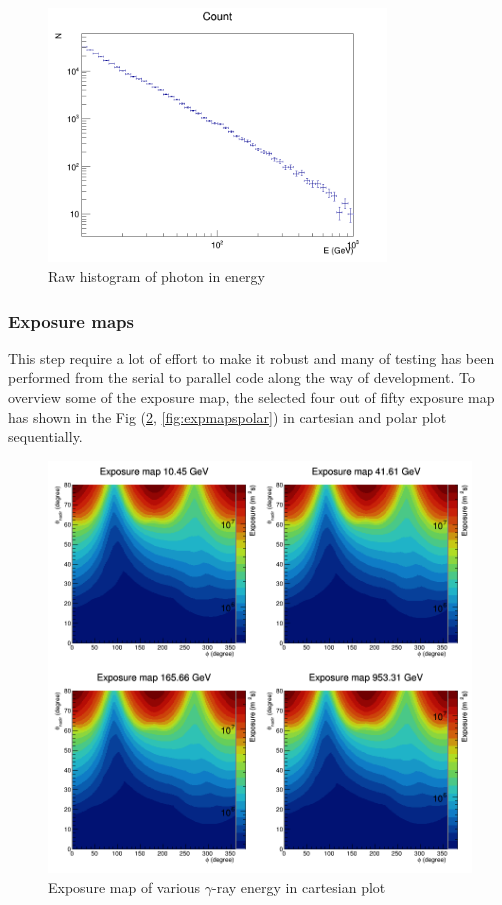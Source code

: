 \begin{figure}[h!]
    \centering
    \includegraphics[width=0.8\textwidth]{img/count_hist}
    \caption{Raw histogram of photon in energy}
    \label{fig:photoncounthist}
\end{figure}

\subsubsection*{Exposure maps}

This step require a lot of effort to make it robust and many of testing has been performed from
the serial to parallel code along the way of development.
To overview some of the exposure map, the selected four out of fifty exposure map has shown in the Fig (\ref{fig:expmapscart}, \ref{fig:expmapspolar}) in cartesian and polar plot sequentially.

\begin{figure}[h!]
    \centering
    \includegraphics[width=\textwidth]{img/cartesian_expmaps}
    \caption{Exposure map of various $\gamma$-ray energy in cartesian plot}
    \label{fig:expmapscart}
\end{figure}

